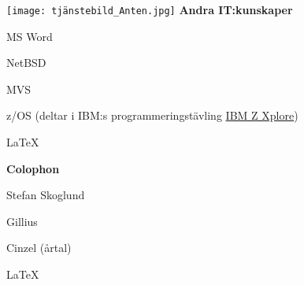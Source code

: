 \documentclass[a4paper,swedish,10pt]{article}
\begin{document}
\begin{minipage}[t]{0.24\textwidth}
  \raggedleft%
  \vspace{-\topskip+1cm}
  \texttt{[image: tjänstebild\_Anten.jpg]}
  \textbf{Andra IT:kunskaper}
  \begin{description}[nosep,itemsep=0.1ex]
    \raggedleft\setlength\itemsep{0.1ex}\small%
  \item MS Word
  \item NetBSD
  \item MVS
  \item z/OS (deltar i IBM:s programmeringstävling \href{https://ibmzxplore.influitive.com/forum/}{IBM Z Xplore})
  \item \LaTeX
  \end{description}

  \vspace{13cm}
  \textbf{Colophon}
  \begin{description}[nosep,itemsep=0.1ex]
    \setlength\itemsep{0.1ex}\small%
  \item Stefan Skoglund {}
  \item Gillius
  \item Cinzel (årtal)
  \item \LaTeX%
  \end{description}%
\end{minipage}%
\end{document}
